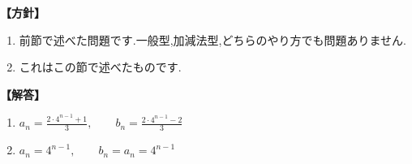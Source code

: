     \noindent\textbf{【方針】}
    \begin{enumerate}[label=(\arabic*),parsep=3pt]
      \item 前節で述べた問題です.一般型,加減法型,どちらのやり方でも問題ありません.
      \item これはこの節で述べたものです.
    \end{enumerate}

    \noindent\textbf{【解答】}
    \begin{enumerate}[label=(\arabic*),parsep=3pt]
      \item $\displaystyle a_n=\frac{2\cdot4^{n-1}+1}{3},\qquad b_n=\frac{2\cdot4^{n-1}-2}{3}$
      \item $\displaystyle a_n=4^{n-1},\qquad b_n=a_n=4^{n-1}$
    \end{enumerate}

